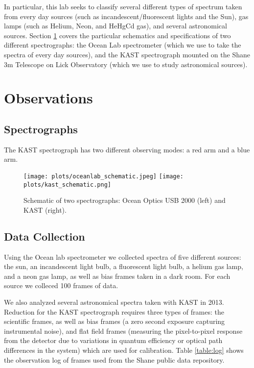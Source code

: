 \documentclass[preprint]{aastex62}
\begin{document}
In particular, this lab seeks to classify several different types of spectrum taken from every day sources (such as incandescent/fluorescent lights and the Sun), gas lamps (such as Helium, Neon, and HeHgCd gas), and several astronomical sources.
Section \ref{sec:observations} covers the particular schematics and specifications of two different spectrographs: the Ocean Lab spectrometer (which we use to take the spectra of every day sources), and the KAST spectrograph mounted on the Shane 3m Telescope on Lick Observatory (which we use to study astronomical sources). 


\section{Observations} \label{sec:observations}
\subsection{Spectrographs}
The KAST spectrograph has two different observing modes: a red arm and a blue arm.

\begin{figure}[H]
\begin{center}
\texttt{[image: plots/oceanlab\_schematic.jpeg]}
\texttt{[image: plots/kast\_schematic.png]} 
\caption{Schematic of two spectrographs: Ocean Optics USB 2000 (left) and KAST (right).}
\end{center}
\end{figure}

\subsection{Data Collection}
Using the Ocean lab spectrometer we collected spectra of five different sources: the sun, an incandescent light bulb, a fluorescent light bulb, a helium gas lamp, and a neon gas lamp, as well as bias frames taken in a dark room. For each source we colleced 100 frames of data.

We also analyzed several astronomical spectra taken with KAST in 2013. Reduction for the KAST spectrograph requires three types of frames: the scientific frames, as well as bias frames (a zero second exposure capturing instrumental noise), and flat field frames (measuring the pixel-to-pixel
response from the detector due to variations in quantum efficiency or optical path differences in the system) which are used for calibration. Table \ref{table:log} shows the observation log of frames used from the Shane public data repository.
\end{document}
